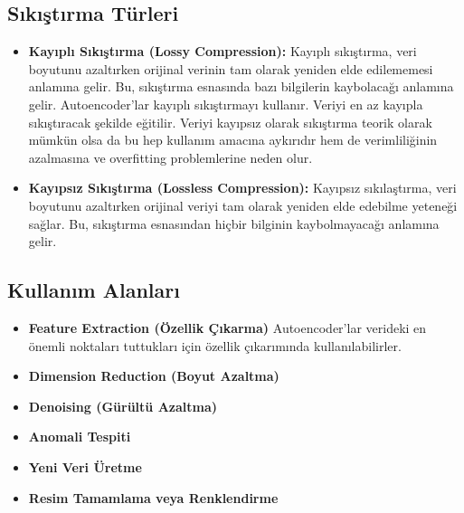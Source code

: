 \subsection{Sıkıştırma Türleri}
\begin{itemize}
    \item \textbf{Kayıplı Sıkıştırma (Lossy Compression):} Kayıplı sıkıştırma, veri boyutunu azaltırken orijinal verinin tam olarak yeniden elde edilememesi anlamına gelir. Bu, sıkıştırma esnasında bazı bilgilerin kaybolacağı anlamına gelir. Autoencoder'lar kayıplı sıkıştırmayı kullanır. Veriyi en az kayıpla sıkıştıracak şekilde eğitilir. Veriyi kayıpsız olarak sıkıştırma teorik olarak mümkün olsa da bu hep kullanım amacına aykırıdır hem de verimliliğinin azalmasına ve overfitting problemlerine neden olur. 
    \item \textbf{Kayıpsız Sıkıştırma (Lossless Compression):} Kayıpsız sıkılaştırma, veri boyutunu azaltırken orijinal veriyi tam olarak yeniden elde edebilme yeteneği sağlar. Bu, sıkıştırma esnasından hiçbir bilginin kaybolmayacağı anlamına gelir.
\end{itemize}

\subsection{Kullanım Alanları}
\begin{itemize}
    \item \textbf{Feature Extraction (Özellik Çıkarma)} Autoencoder'lar verideki en önemli noktaları tuttukları için özellik çıkarımında kullanılabilirler.
    \item \textbf{Dimension Reduction (Boyut Azaltma)}
    \item \textbf{Denoising (Gürültü Azaltma)}
    \item \textbf{Anomali Tespiti}
    \item \textbf{Yeni Veri Üretme}
    \item \textbf{Resim Tamamlama veya Renklendirme}
\end{itemize}

